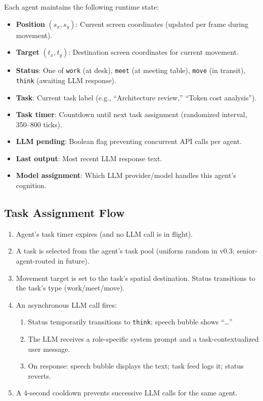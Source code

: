 \documentclass[11pt,letterpaper]{article}
\begin{document}
Each agent maintains the following runtime state:

\begin{itemize}[leftmargin=2em]
  \item \textbf{Position} $(s_x, s_y)$: Current screen coordinates (updated per frame during movement).
  \item \textbf{Target} $(t_x, t_y)$: Destination screen coordinates for current movement.
  \item \textbf{Status}: One of \texttt{work} (at desk), \texttt{meet} (at meeting table), \texttt{move} (in transit), \texttt{think} (awaiting LLM response).
  \item \textbf{Task}: Current task label (e.g., ``Architecture review,'' ``Token cost analysis'').
  \item \textbf{Task timer}: Countdown until next task assignment (randomized interval, 350--800 ticks).
  \item \textbf{LLM pending}: Boolean flag preventing concurrent API calls per agent.
  \item \textbf{Last output}: Most recent LLM response text.
  \item \textbf{Model assignment}: Which LLM provider/model handles this agent's cognition.
\end{itemize}

\subsection{Task Assignment Flow}

\begin{enumerate}[leftmargin=2em]
  \item Agent's task timer expires (and no LLM call is in flight).
  \item A task is selected from the agent's task pool (uniform random in v0.3; senior-agent-routed in future).
  \item Movement target is set to the task's spatial destination. Status transitions to the task's type (work/meet/move).
  \item An asynchronous LLM call fires:
    \begin{enumerate}
      \item Status temporarily transitions to \texttt{think}; speech bubble shows ``\ldots''
      \item The LLM receives a role-specific system prompt and a task-contextualized user message.
      \item On response: speech bubble displays the text; task feed logs it; status reverts.
    \end{enumerate}
  \item A 4-second cooldown prevents successive LLM calls for the same agent.
\end{enumerate}
\end{document}
